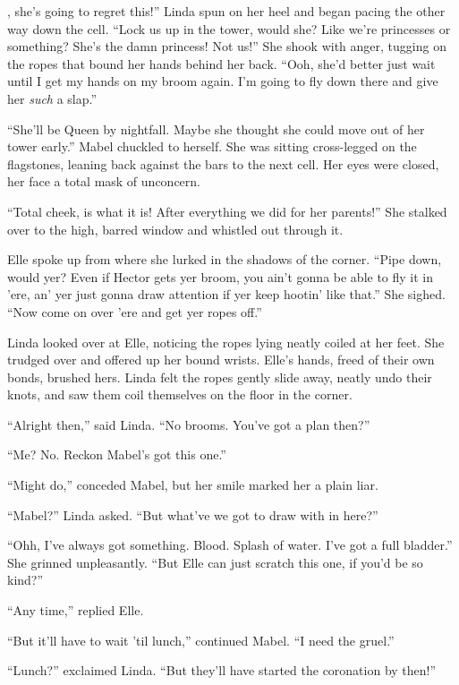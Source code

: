 
, she's going to regret this!''
Linda spun on her heel and began pacing the other way down the cell.
``Lock us up in the tower, would she?
Like we're princesses or something?
She's the damn princess!
Not us!''
She shook with anger, tugging on the ropes that bound her hands behind her back.
``Ooh, she'd better just wait until I get my hands on my broom again.
I'm going to fly down there and give her \emph{such} a slap.''

``She'll be Queen by nightfall.
Maybe she thought she could move out of her tower early.''
Mabel chuckled to herself.
She was sitting cross-legged on the flagstones, leaning back against the bars to the next cell.
Her eyes were closed, her face a total mask of unconcern.

``Total cheek, is what it is!
After everything we did for her parents!''
She stalked over to the high, barred window and whistled out through it.

Elle spoke up from where she lurked in the shadows of the corner.
``Pipe down, would yer?
Even if Hector gets yer broom, you ain't gonna be able to fly it in 'ere, an' yer just gonna draw attention if yer keep hootin' like that.''
She sighed.
``Now come on over 'ere and get yer ropes off.''

Linda looked over at Elle, noticing the ropes lying neatly coiled at her feet.
She trudged over and offered up her bound wrists.
Elle's hands, freed of their own bonds, brushed hers.
Linda felt the ropes gently slide away, neatly undo their knots, and saw them coil themselves on the floor in the corner.

``Alright then,'' said Linda.
``No brooms.
You've got a plan then?''

``Me?
No.
Reckon Mabel's got this one.''

``Might do,'' conceded Mabel, but her smile marked her a plain liar.

``Mabel?'' Linda asked.
``But what've we got to draw with in here?''

``Ohh, I've always got something.
Blood.
Splash of water.
I've got a full bladder.''
She grinned unpleasantly.
``But Elle can just scratch this one, if you'd be so kind?''

``Any time,'' replied Elle.

``But it'll have to wait 'til lunch,'' continued Mabel.
``I need the gruel.''

``Lunch?'' exclaimed Linda.
``But they'll have started the coronation by then!''

